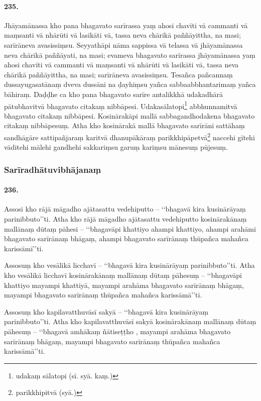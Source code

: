 \paragraph{235.} Jhāyamānassa kho pana bhagavato sarīrassa yaṃ ahosi chavīti vā cammanti vā maṃsanti vā nhārūti vā lasikāti vā, tassa neva chārikā paññāyittha, na masi; sarīrāneva avasissiṃsu. Seyyathāpi nāma sappissa vā telassa vā jhāyamānassa neva chārikā paññāyati, na masi; evameva bhagavato sarīrassa jhāyamānassa yaṃ ahosi chavīti vā cammanti vā maṃsanti vā nhārūti vā lasikāti vā, tassa neva chārikā paññāyittha, na masi; sarīrāneva avasissiṃsu. Tesañca pañcannaṃ dussayugasatānaṃ dveva dussāni na ḍayhiṃsu yañca sabbaabbhantarimaṃ yañca bāhiraṃ. Daḍḍhe ca kho pana bhagavato sarīre antalikkhā udakadhārā pātubhavitvā bhagavato citakaṃ nibbāpesi. Udakasālatopi\footnote{udakaṃ sālatopi (sī. syā. kaṃ.)} abbhunnamitvā bhagavato citakaṃ nibbāpesi. Kosinārakāpi mallā sabbagandhodakena bhagavato citakaṃ nibbāpesuṃ. Atha kho kosinārakā mallā bhagavato sarīrāni sattāhaṃ sandhāgāre sattipañjaraṃ karitvā dhanupākāraṃ parikkhipāpetvā\footnote{parikkhipitvā (syā.)} naccehi gītehi vāditehi mālehi gandhehi sakkariṃsu garuṃ kariṃsu mānesuṃ pūjesuṃ.

\subsubsection{Sarīradhātuvibhājanaṃ}

\paragraph{236.} Assosi kho rājā māgadho ajātasattu vedehiputto – ‘‘bhagavā kira kusinārāyaṃ parinibbuto’’ti. Atha kho rājā māgadho ajātasattu vedehiputto kosinārakānaṃ mallānaṃ dūtaṃ pāhesi – ‘‘bhagavāpi khattiyo ahampi khattiyo, ahampi arahāmi bhagavato sarīrānaṃ bhāgaṃ, ahampi bhagavato sarīrānaṃ thūpañca mahañca karissāmī’’ti.

Assosuṃ kho vesālikā licchavī – ‘‘bhagavā kira kusinārāyaṃ parinibbuto’’ti. Atha kho vesālikā licchavī kosinārakānaṃ mallānaṃ dūtaṃ pāhesuṃ – ‘‘bhagavāpi khattiyo mayampi khattiyā, mayampi arahāma bhagavato sarīrānaṃ bhāgaṃ, mayampi bhagavato sarīrānaṃ thūpañca mahañca karissāmā’’ti.

Assosuṃ kho kapilavatthuvāsī sakyā – ‘‘bhagavā kira kusinārāyaṃ parinibbuto’’ti. Atha kho kapilavatthuvāsī sakyā kosinārakānaṃ mallānaṃ dūtaṃ pāhesuṃ – ‘‘bhagavā amhākaṃ ñātiseṭṭho , mayampi arahāma bhagavato sarīrānaṃ bhāgaṃ, mayampi bhagavato sarīrānaṃ thūpañca mahañca karissāmā’’ti.

